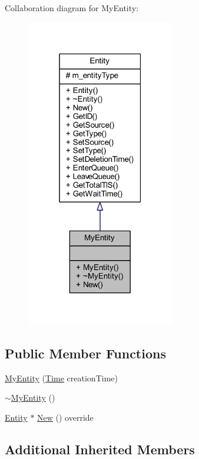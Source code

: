 Collaboration diagram for My\+Entity\+:\nopagebreak
\begin{figure}[H]
\begin{center}
\leavevmode
\includegraphics[width=183pt]{class_my_entity__coll__graph}
\end{center}
\end{figure}
\subsection*{Public Member Functions}
\begin{DoxyCompactItemize}
\item 
\hyperlink{class_my_entity_a2ef0bc770ce958c4f51c453e870d3478}{My\+Entity} (\hyperlink{_simulation_executive_8h_ac2d3e0ba793497bcca555c7c2cf64ff3}{Time} creation\+Time)
\item 
\hyperlink{class_my_entity_ac575adbb2632db8db827e9453998b611}{$\sim$\+My\+Entity} ()
\item 
\hyperlink{class_entity}{Entity} $\ast$ \hyperlink{class_my_entity_acc29e753a0df1928eb4c9e627d65a3b3}{New} () override
\end{DoxyCompactItemize}
\subsection*{Additional Inherited Members}


